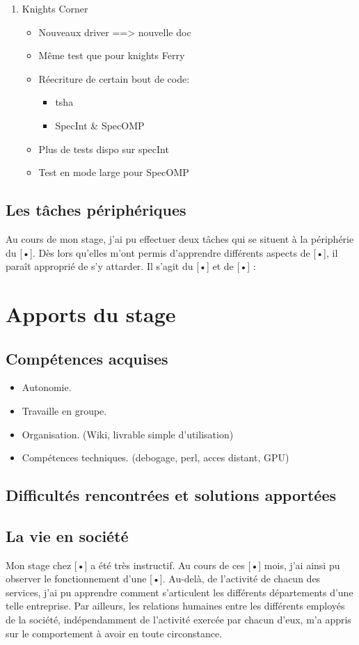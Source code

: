 \documentclass{article}
\begin{document}
\begin{enumerate}
\begin{itemize}
				\end{itemize}
			\item Knights Corner
				\begin{itemize}
				\item Nouveaux driver ==> nouvelle doc
				\item Même test que pour knights Ferry
				\item Réecriture de certain bout de code:
						\begin{itemize}
						\item tsha
						\item SpecInt \& SpecOMP
						\end{itemize}
				\item Plus de tests dispo sur specInt
				\item Test en mode large pour SpecOMP
				\end{itemize}
			\end{enumerate}
		\subsection{Les tâches périphériques}
			Au cours de mon stage, j’ai pu effectuer deux tâches qui se situent à la périphérie du [•]. Dès lors qu’elles 
			m’ont permis d’apprendre différents aspects de [•], il paraît approprié de s’y attarder. Il s’agit du [•] et 
			de [•] :
	\section{Apports du stage}
		\subsection{Compétences acquises}
			\begin{itemize}
			\item Autonomie.
			\item Travaille en groupe.
			\item Organisation. (Wiki, livrable simple d'utilisation)
			\item Compétences techniques. (debogage, perl, acces distant, GPU)
			\end{itemize}
		\subsection{Difficultés rencontrées et solutions apportées}
		\subsection{La vie en société}
			Mon stage chez [•] a été très instructif. Au cours de ces [•] mois, j’ai ainsi pu observer le fonctionnement 
			d’une [•]. Au-delà, de l’activité de chacun des services, j’ai pu apprendre comment s’articulent les différents 
			départements d’une telle entreprise. Par ailleurs, les relations humaines entre les différents employés de la 
			société, indépendamment de l’activité exercée par chacun d’eux, m’a appris sur le comportement à avoir en toute 
			circonstance.
\end{document}
